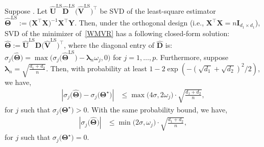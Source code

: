 \documentclass[alpha-refs]{wiley-article}
\begin{document}
\begin{proposition} \label{clsed-form}
    Suppose .
    Let $\widehat{\boldsymbol{U}}^{\text{LS}}\widehat{\boldsymbol{D}}^{\text{LS}}\big(\widehat{\boldsymbol{V}}^{\text{LS}}\big)^{\top}$ be SVD of the least-square estimator $\widehat{\boldsymbol{\Theta}}^{\text{LS}}:=\big(\boldsymbol{X}^{\top}\boldsymbol{X}\big)^{-1}\boldsymbol{X}^{\top}\boldsymbol{Y}$.
    Then, under the orthogonal design (i.e., $\boldsymbol{X}^{\top}\boldsymbol{X}=n\boldsymbol{I}_{d_{1} \times d_{1}}$), SVD of the minimizer of~\eqref{WMVR} has a following closed-form solution:
    $\widehat{\boldsymbol{\Theta}} := \widehat{\boldsymbol{U}}^{\text{LS}}\widehat{\boldsymbol{D}}\big(\widehat{\boldsymbol{V}}^{\text{LS}}\big)^{\top}$,
    where the diagonal entry of $\widehat{\boldsymbol{D}}$ is: 
    $\sigma_{j}\big(\widehat{\boldsymbol{\Theta}}\big) = \max \big(  \sigma_{j}\big(\widehat{\boldsymbol{\Theta}}^{\text{LS}}\big)-\boldsymbol{\lambda}_{n} \omega_{j},0 \big)$ for $j=1,\dots,p$.
    Furthermore, suppose $\boldsymbol{\lambda}_{n}=\sqrt{\frac{d_{1}+d_{2}}{n}}$.
    Then, with probability at least $1-2\exp(-(\sqrt{d_{1}}+\sqrt{d_{2}})^{2}/2)$, we have,
    \begin{align} \label{sing1}
        \left| \sigma_{j}\big(\widehat{\boldsymbol{\Theta}}\big)-\sigma_{j}\big(\boldsymbol{\Theta}^{\star}\big)\right|
        &\leq \max\big(4\sigma,2\omega_{j}\big)\cdot \sqrt{\frac{d_{1}+d_{2}}{n}},
    \end{align}
    for $j$ such that $\sigma_{j}\big(\boldsymbol{\Theta}^{\star}\big)>0$. 
    With the same probability bound, we have,
    \begin{align} \label{sing2}
        \left| \sigma_{j}\big(\widehat{\boldsymbol{\Theta}}\big)\right|
        &\leq \min\big(2\sigma,\omega_{j}\big)\cdot \sqrt{\frac{d_{1}+d_{2}}{n}},
    \end{align}
    for $j$ such that $\sigma_{j}\big(\boldsymbol{\Theta}^{\star}\big)=0$. 
\end{proposition}
\end{document}

